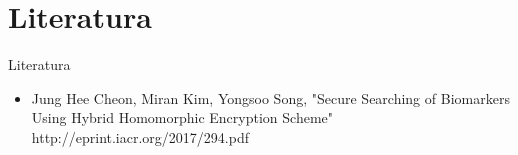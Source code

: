 \documentclass[10pt]{beamer}
\begin{document}

\section{Literatura}
\begin{frame}{Literatura}
\begin{itemize}
\item Jung Hee Cheon, Miran Kim, Yongsoo Song, "Secure Searching of Biomarkers Using Hybrid Homomorphic Encryption Scheme"\\ http://eprint.iacr.org/2017/294.pdf
\end{itemize}

\end{frame}


{\1
\begin{frame}
\end{frame}}
\end{document}
